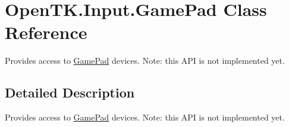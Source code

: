 \hypertarget{class_open_t_k_1_1_input_1_1_game_pad}{\section{Open\-T\-K.\-Input.\-Game\-Pad Class Reference}
\label{class_open_t_k_1_1_input_1_1_game_pad}
}


Provides access to \hyperlink{class_open_t_k_1_1_input_1_1_game_pad}{Game\-Pad} devices. Note\-: this A\-P\-I is not implemented yet.  




\subsection{Detailed Description}
Provides access to \hyperlink{class_open_t_k_1_1_input_1_1_game_pad}{Game\-Pad} devices. Note\-: this A\-P\-I is not implemented yet. 


